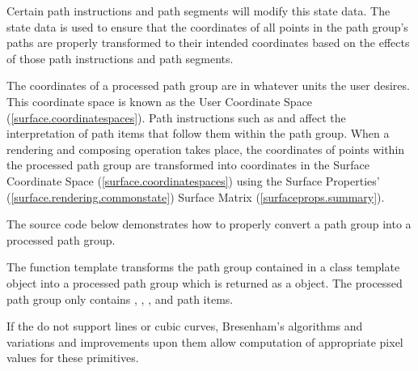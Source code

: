 \pnum
Certain path instructions and path segments will modify this state data. The state data is used to ensure that the coordinates of all points in the path group's paths are properly transformed to their intended coordinates based on the effects of those path instructions and path segments.

\pnum
\enternote
The coordinates of a processed path group are in whatever units the user desires. This coordinate space is known as the User Coordinate Space (\ref{surface.coordinatespaces}). Path instructions such as  and  affect the interpretation of path items that follow them within the path group. When a rendering and composing operation takes place, the coordinates of points within the processed path group are transformed into coordinates in the Surface Coordinate Space (\ref{surface.coordinatespaces}) using the Surface Properties' (\ref{surface.rendering.commonstate}) Surface Matrix (\ref{surfaceprops.summary}).
\exitnote

\pnum
The source code below demonstrates how to properly convert a path group into a processed path group.

\pnum
The  function template transforms the path group contained in a  class template object into a processed path group which is returned as a  object. The processed path group only contains , , , and  path items.

\pnum
\enternote
If the \underlyingrendandpresenttechs do not support lines or cubic \bezierlocal curves, Bresenham's algorithms and variations and improvements upon them allow computation of appropriate pixel values for these primitives.
\exitnote
\\



\addtocounter{SectionDepthBase}{1}




















\addtocounter{SectionDepthBase}{-1}
